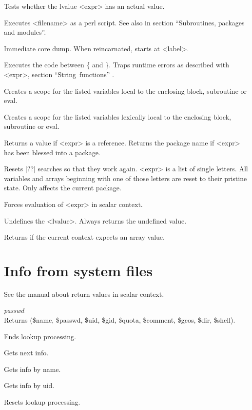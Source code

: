 \begin{enum}{1cm}

Tests whether the lvalue <expr> has an actual value.

Executes <filename> as a perl script.\ddag
See also  in section ``Subroutines, packages and modules''.

Immediate core dump. When reincarnated, starts at <label>.

Executes the code between \{ and \}. Traps runtime errors as described
with <expr>\kwd{)}, section ``String~functions'' .

Creates a scope for the listed variables local to the enclosing block,
subroutine or eval. 

Creates a scope for the listed variables lexically
local to the enclosing block, subroutine or eval.\ddag 

Returns a \true{} value if <expr> is a reference.
Returns the package name if <expr> has been blessed into a package.\ddag

Resets |??| searches so that they work again. <expr> is a list of
single letters. All variables and arrays beginning with one of those
letters are reset to their pristine state.  Only affects the current
package.

Forces evaluation of <expr> in scalar context.

Undefines the <lvalue>. Always returns the undefined value.

Returns \true{} if the current context expects an array value.

\end{enum}

\newpage

\section{Info from system files} 
See the manual about return values in scalar context.

{\large\sl passwd} \\
Returns (\$name, \$passwd, \$uid, \$gid, \$quota, \$comment, \$gcos, \$dir, \$shell).

\begin{enum}{6cm}

Ends lookup processing.

Gets next info.

Gets info by name. 

Gets info by uid.

Resets lookup processing.

\end{enum}

